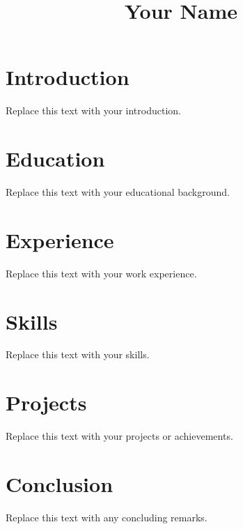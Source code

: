 \documentclass{article}
\begin{document}
\title{Your Name}
\author{}
\date{}

\maketitle

\section{Introduction}
Replace this text with your introduction.

\section{Education}
Replace this text with your educational background.

\section{Experience}
Replace this text with your work experience.

\section{Skills}
Replace this text with your skills.

\section{Projects}
Replace this text with your projects or achievements.

\section{Conclusion}
Replace this text with any concluding remarks.
\end{document}
